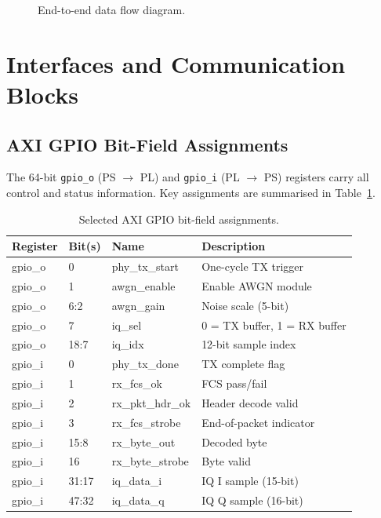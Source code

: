\documentclass[12pt, a4paper, oneside]{report}
\begin{document}
\begin{figure}[H]
{%
  }
  \caption{End-to-end data flow diagram.}
  \label{fig:dataflow}
\end{figure}

\section{Interfaces and Communication Blocks}

\subsection{AXI GPIO Bit-Field Assignments}

The 64-bit \texttt{gpio\_o} (PS $\to$ PL) and \texttt{gpio\_i} (PL $\to$ PS) registers carry all control and status information. Key assignments are summarised in Table~\ref{tab:gpio_map}.

\begin{table}[H]
  \centering
  \caption{Selected AXI GPIO bit-field assignments.}
  \label{tab:gpio_map}
  \begin{tabular}{lllp{5.5cm}}
    \toprule
    \textbf{Register} & \textbf{Bit(s)} & \textbf{Name} & \textbf{Description} \\
    \midrule
    gpio\_o & 0     & phy\_tx\_start    & One-cycle TX trigger \\
    gpio\_o & 1     & awgn\_enable      & Enable AWGN module \\
    gpio\_o & 6:2   & awgn\_gain        & Noise scale (5-bit) \\
    gpio\_o & 7     & iq\_sel           & 0 = TX buffer, 1 = RX buffer \\
    gpio\_o & 18:7  & iq\_idx           & 12-bit sample index \\
    \midrule
    gpio\_i & 0     & phy\_tx\_done     & TX complete flag \\
    gpio\_i & 1     & rx\_fcs\_ok       & FCS pass/fail \\
    gpio\_i & 2     & rx\_pkt\_hdr\_ok  & Header decode valid \\
    gpio\_i & 3     & rx\_fcs\_strobe   & End-of-packet indicator \\
    gpio\_i & 15:8  & rx\_byte\_out     & Decoded byte \\
    gpio\_i & 16    & rx\_byte\_strobe  & Byte valid \\
    gpio\_i & 31:17 & iq\_data\_i       & IQ I sample (15-bit) \\
    gpio\_i & 47:32 & iq\_data\_q       & IQ Q sample (16-bit) \\
    \bottomrule
  \end{tabular}
\end{table}
\end{document}
